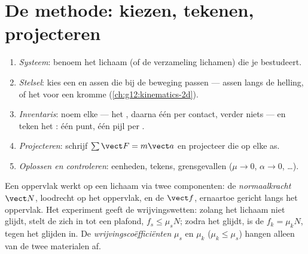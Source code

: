 \section{De methode: kiezen, tekenen, projecteren}

\begin{method}\label{met:g12:newtons-laws:method}
\begin{enumerate}
  \item \emph{Systeem}: benoem het lichaam (of de verzameling lichamen) die je
        bestudeert.
  \item \emph{Stelsel}: kies een  en assen die bij de beweging
        passen --- assen langs de helling, of het  voor een kromme
        (\cref{ch:g12:kinematics-2d}).
  \item \emph{Inventaris}: noem elke  --- het , daarna één  per
        contact, verder niets --- en teken het : één punt, één pijl per
        .
  \item \emph{Projecteren}: schrijf $\sum \vect F = m\vect a$ en projecteer die op
        elke as.
  \item \emph{Oplossen en controleren}: eenheden, tekens, grensgevallen
        ($\mu \to 0$, $\alpha \to 0$, \dots).
\end{enumerate}
\end{method}

\begin{definition}\label{def:g12:newtons-laws:friction}
Een oppervlak werkt op een lichaam via twee componenten: de
\emph{normaalkracht} $\vect N$, loodrecht op het oppervlak, en
de  $\vect f$, ernaartoe gericht langs het oppervlak. Het experiment geeft de
wrijvingswetten: zolang het lichaam niet glijdt, stelt de  zich in
tot een plafond, $f_s \leq \mu_s N$; zodra het glijdt, is de 
$f_k = \mu_k N$, tegen het glijden in. De
\emph{wrijvingscoëfficiënten} $\mu_s$ en $\mu_k$
($\mu_k \leq \mu_s$) hangen alleen van de twee materialen af.
\end{definition}


